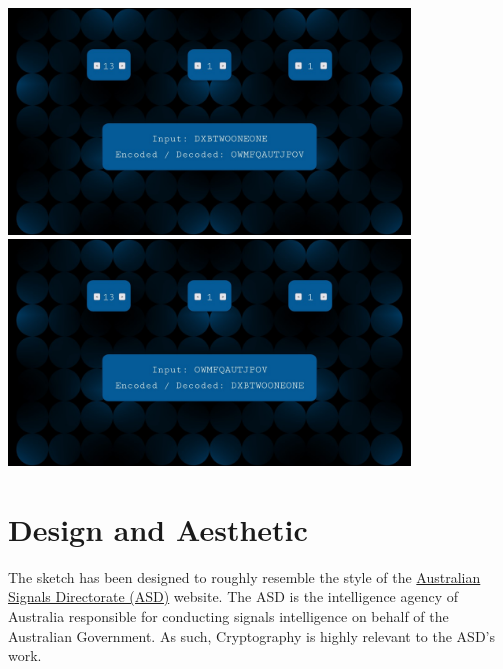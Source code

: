 \documentclass[12pt,a4paper]{article}
\begin{document}
		\begin{center}
			\includegraphics[width=0.8\textwidth]{figures/figure1.jpg}\\
			\vspace{0.5cm}
			\includegraphics[width=0.8\textwidth]{figures/figure2.jpg}\\
		\end{center}
	
	\newpage

	\section{Design and Aesthetic}
		The sketch has been designed to roughly resemble the style of the 
		\href{https://www.asd.gov.au/}{Australian Signals Directorate (ASD)} website. 
		The ASD is the intelligence agency of Australia responsible for conducting 
		signals intelligence on behalf of the Australian Government. As such, 
		Cryptography is highly relevant to the ASD's work.\\
		
		\begin{center}
			\\
		\end{center}
\end{document}
